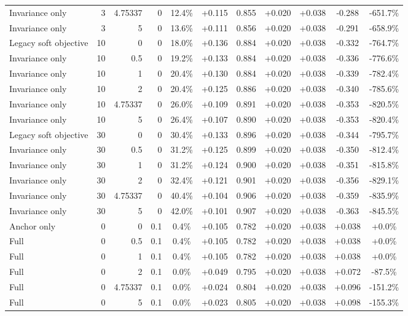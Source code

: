 \begin{table}[htbp]
\begin{tabular}{lrrrccccccc}
Invariance only & 3 & 4.75337 & 0 & 12.4\% & +0.115 & 0.855 & +0.020 & +0.038 & -0.288 & -651.7\% \\
Invariance only & 3 & 5 & 0 & 13.6\% & +0.111 & 0.856 & +0.020 & +0.038 & -0.291 & -658.9\% \\
Legacy soft objective & 10 & 0 & 0 & 18.0\% & +0.136 & 0.884 & +0.020 & +0.038 & -0.332 & -764.7\% \\
Invariance only & 10 & 0.5 & 0 & 19.2\% & +0.133 & 0.884 & +0.020 & +0.038 & -0.336 & -776.6\% \\
Invariance only & 10 & 1 & 0 & 20.4\% & +0.130 & 0.884 & +0.020 & +0.038 & -0.339 & -782.4\% \\
Invariance only & 10 & 2 & 0 & 20.4\% & +0.125 & 0.886 & +0.020 & +0.038 & -0.340 & -785.6\% \\
Invariance only & 10 & 4.75337 & 0 & 26.0\% & +0.109 & 0.891 & +0.020 & +0.038 & -0.353 & -820.5\% \\
Invariance only & 10 & 5 & 0 & 26.4\% & +0.107 & 0.890 & +0.020 & +0.038 & -0.353 & -820.4\% \\
Legacy soft objective & 30 & 0 & 0 & 30.4\% & +0.133 & 0.896 & +0.020 & +0.038 & -0.344 & -795.7\% \\
Invariance only & 30 & 0.5 & 0 & 31.2\% & +0.125 & 0.899 & +0.020 & +0.038 & -0.350 & -812.4\% \\
Invariance only & 30 & 1 & 0 & 31.2\% & +0.124 & 0.900 & +0.020 & +0.038 & -0.351 & -815.8\% \\
Invariance only & 30 & 2 & 0 & 32.4\% & +0.121 & 0.901 & +0.020 & +0.038 & -0.356 & -829.1\% \\
Invariance only & 30 & 4.75337 & 0 & 40.4\% & +0.104 & 0.906 & +0.020 & +0.038 & -0.359 & -835.9\% \\
Invariance only & 30 & 5 & 0 & 42.0\% & +0.101 & 0.907 & +0.020 & +0.038 & -0.363 & -845.5\% \\
Anchor only & 0 & 0 & 0.1 & 0.4\% & +0.105 & 0.782 & +0.020 & +0.038 & +0.038 & +0.0\% \\
Full & 0 & 0.5 & 0.1 & 0.4\% & +0.105 & 0.782 & +0.020 & +0.038 & +0.038 & +0.0\% \\
Full & 0 & 1 & 0.1 & 0.4\% & +0.105 & 0.782 & +0.020 & +0.038 & +0.038 & +0.0\% \\
Full & 0 & 2 & 0.1 & 0.0\% & +0.049 & 0.795 & +0.020 & +0.038 & +0.072 & -87.5\% \\
Full & 0 & 4.75337 & 0.1 & 0.0\% & +0.024 & 0.804 & +0.020 & +0.038 & +0.096 & -151.2\% \\
Full & 0 & 5 & 0.1 & 0.0\% & +0.023 & 0.805 & +0.020 & +0.038 & +0.098 & -155.3\% \\

\end{tabular}
\end{table}
